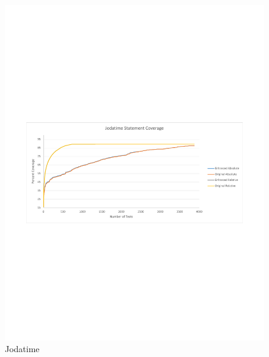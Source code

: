 \begin{figure}[t]
\begin{minipage}[b]{\linewidth}
\centering
\includegraphics[scale=0.46]{jodatime-coverage-figure}
Jodatime
\end{minipage}
\begin{minipage}[b]{\linewidth}
\centering

\end{minipage}
\end{figure}
